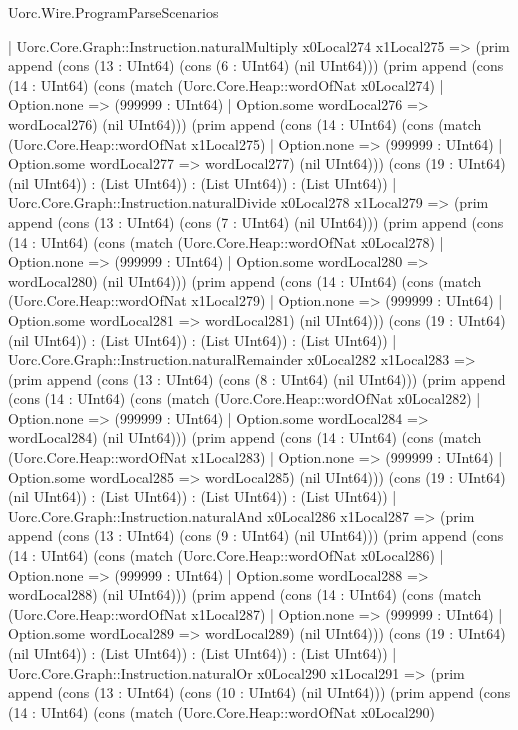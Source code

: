 \begin{lexlean}{Uorc.Wire.ProgramParseScenarios}
\begin{semanticmodule}
{    | Uorc.Core.Graph::Instruction.naturalMultiply x0Local274 x1Local275 => (prim append (cons (13 : UInt64) (cons (6 : UInt64) (nil UInt64))) (prim append (cons (14 : UInt64) (cons (match (Uorc.Core.Heap::wordOfNat x0Local274)
      | Option.none => (999999 : UInt64)
      | Option.some wordLocal276 => wordLocal276) (nil UInt64))) (prim append (cons (14 : UInt64) (cons (match (Uorc.Core.Heap::wordOfNat x1Local275)
      | Option.none => (999999 : UInt64)
      | Option.some wordLocal277 => wordLocal277) (nil UInt64))) (cons (19 : UInt64) (nil UInt64)) : (List UInt64)) : (List UInt64)) : (List UInt64))
    | Uorc.Core.Graph::Instruction.naturalDivide x0Local278 x1Local279 => (prim append (cons (13 : UInt64) (cons (7 : UInt64) (nil UInt64))) (prim append (cons (14 : UInt64) (cons (match (Uorc.Core.Heap::wordOfNat x0Local278)
      | Option.none => (999999 : UInt64)
      | Option.some wordLocal280 => wordLocal280) (nil UInt64))) (prim append (cons (14 : UInt64) (cons (match (Uorc.Core.Heap::wordOfNat x1Local279)
      | Option.none => (999999 : UInt64)
      | Option.some wordLocal281 => wordLocal281) (nil UInt64))) (cons (19 : UInt64) (nil UInt64)) : (List UInt64)) : (List UInt64)) : (List UInt64))
    | Uorc.Core.Graph::Instruction.naturalRemainder x0Local282 x1Local283 => (prim append (cons (13 : UInt64) (cons (8 : UInt64) (nil UInt64))) (prim append (cons (14 : UInt64) (cons (match (Uorc.Core.Heap::wordOfNat x0Local282)
      | Option.none => (999999 : UInt64)
      | Option.some wordLocal284 => wordLocal284) (nil UInt64))) (prim append (cons (14 : UInt64) (cons (match (Uorc.Core.Heap::wordOfNat x1Local283)
      | Option.none => (999999 : UInt64)
      | Option.some wordLocal285 => wordLocal285) (nil UInt64))) (cons (19 : UInt64) (nil UInt64)) : (List UInt64)) : (List UInt64)) : (List UInt64))
    | Uorc.Core.Graph::Instruction.naturalAnd x0Local286 x1Local287 => (prim append (cons (13 : UInt64) (cons (9 : UInt64) (nil UInt64))) (prim append (cons (14 : UInt64) (cons (match (Uorc.Core.Heap::wordOfNat x0Local286)
      | Option.none => (999999 : UInt64)
      | Option.some wordLocal288 => wordLocal288) (nil UInt64))) (prim append (cons (14 : UInt64) (cons (match (Uorc.Core.Heap::wordOfNat x1Local287)
      | Option.none => (999999 : UInt64)
      | Option.some wordLocal289 => wordLocal289) (nil UInt64))) (cons (19 : UInt64) (nil UInt64)) : (List UInt64)) : (List UInt64)) : (List UInt64))
    | Uorc.Core.Graph::Instruction.naturalOr x0Local290 x1Local291 => (prim append (cons (13 : UInt64) (cons (10 : UInt64) (nil UInt64))) (prim append (cons (14 : UInt64) (cons (match (Uorc.Core.Heap::wordOfNat x0Local290)
}
\end{semanticmodule}
\end{lexlean}
